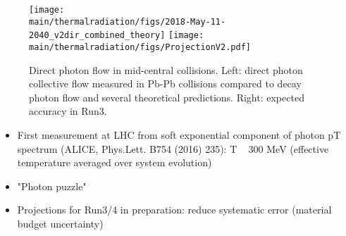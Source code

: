 \begin{figure}[htb]
\centering
\texttt{[image: \\main/thermalradiation/figs/2018-May-11-2040\_v2dir\_combined\_theory]}
\texttt{[image: \\main/thermalradiation/figs/ProjectionV2.pdf]}
\caption{Direct photon flow in mid-central collisions. Left: direct photon collective flow measured in Pb-Pb collisions compared to decay photon flow and several theoretical predictions. Right: expected accuracy in Run3. }
\label{fig:RealPhotonsV2dir}
\end{figure}




\begin{itemize}
\item First measurement at LHC from soft exponential component of photon pT spectrum (ALICE, Phys.Lett. B754 (2016) 235): T ~ 300 MeV (effective temperature averaged over system evolution)
\item "Photon puzzle"
\item Projections for Run3/4 in preparation: reduce systematic error (material budget uncertainty)
\end{itemize}

